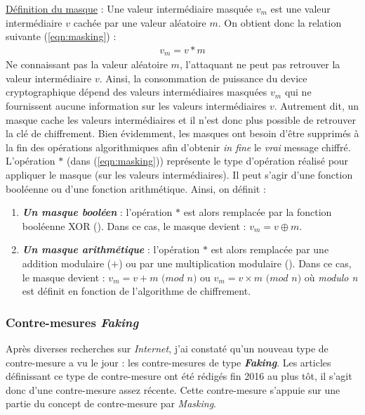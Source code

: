 \documentclass[oneside]{book}
\begin{document}
\underline{Définition du masque} : Une valeur intermédiaire masquée $v_m$ est une valeur intermédiaire $v$ cachée par une valeur aléatoire $m$. On obtient donc la relation suivante (\ref{eqn:masking}) : 
\begin{gather}
	v_m = v * m\label{eqn:masking}
\end{gather}
Ne connaissant pas la valeur aléatoire $m$, l'attaquant ne peut pas retrouver la valeur intermédiaire $v$. Ainsi, la consommation de puissance du device cryptographique dépend des valeurs intermédiaires masquées $v_m$ qui ne fournissent aucune information sur les valeurs intermédiaires $v$. Autrement dit, un masque cache les valeurs intermédiaires et il n'est donc plus possible de retrouver la clé de chiffrement. Bien évidemment, les masques ont besoin d'être supprimés à la fin des opérations algorithmiques afin d'obtenir \textit{in fine} le \textit{vrai} message chiffré. \\
L'opération $*$ (dans (\ref{eqn:masking})) représente le type d'opération réalisé pour appliquer le masque (sur les valeurs intermédiaires). Il peut s'agir d'une fonction booléenne ou d'une fonction arithmétique. Ainsi, on définit : 
\begin{enumerate}
\item \textbf{\textit{Un masque booléen}} : l'opération $*$ est alors remplacée par la fonction booléenne XOR (\oplus). Dans ce cas, le masque devient : $v_m = v \oplus m$.
\item \textbf{\textit{Un masque arithmétique}} : l'opération $*$ est alors remplacée par une addition modulaire ($+$) ou par une multiplication modulaire (\times ). Dans ce cas, le masque devient : $v_m = v + m$ $(mod$ $n)$ ou $v_m = v \times m$ $(mod$ $n)$ où \textit{modulo n} est définit en fonction de l'algorithme de chiffrement.
\end{enumerate}

\newpage

\subsubsection{Contre-mesures \textit{Faking}}

Après diverses recherches sur \textit{Internet}, j'ai constaté qu'un nouveau type de contre-mesure a vu le jour : les contre-mesures de type \textbf{\textit{Faking}}. Les articles définissant ce type de contre-mesure ont été rédigés fin 2016 au plus tôt, il s'agit donc d'une contre-mesure assez récente. Cette contre-mesure s'appuie sur une partie du concept de contre-mesure par \textit{Masking}. 
\end{document}

